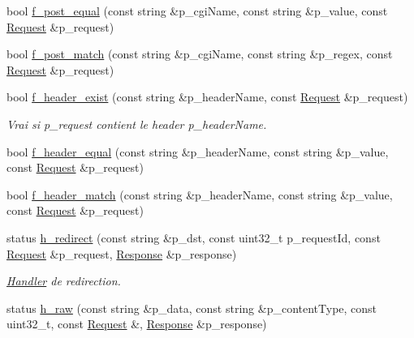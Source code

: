 \begin{DoxyCompactItemize}
bool \hyperlink{classxtd_1_1network_1_1http_1_1Server_a5ffcf38b185fc098c12969df414fe732}{f\+\_\+post\+\_\+equal} (const string \&p\+\_\+cgi\+Name, const string \&p\+\_\+value, const \hyperlink{classxtd_1_1network_1_1http_1_1Request}{Request} \&p\+\_\+request)
\item 
bool \hyperlink{classxtd_1_1network_1_1http_1_1Server_af5dbf38109b8345e6dcc7f29dfdd781a}{f\+\_\+post\+\_\+match} (const string \&p\+\_\+cgi\+Name, const string \&p\+\_\+regex, const \hyperlink{classxtd_1_1network_1_1http_1_1Request}{Request} \&p\+\_\+request)
\item 
bool \hyperlink{classxtd_1_1network_1_1http_1_1Server_a7f7478d5e4c12fed3743b42f7d118398}{f\+\_\+header\+\_\+exist} (const string \&p\+\_\+header\+Name, const \hyperlink{classxtd_1_1network_1_1http_1_1Request}{Request} \&p\+\_\+request)
\begin{DoxyCompactList}\small\item\em Vrai si p\+\_\+request contient le header p\+\_\+header\+Name. \end{DoxyCompactList}\item 
bool \hyperlink{classxtd_1_1network_1_1http_1_1Server_a68192c550d0c9aa2d3341c3b7acbbb55}{f\+\_\+header\+\_\+equal} (const string \&p\+\_\+header\+Name, const string \&p\+\_\+value, const \hyperlink{classxtd_1_1network_1_1http_1_1Request}{Request} \&p\+\_\+request)
\item 
bool \hyperlink{classxtd_1_1network_1_1http_1_1Server_a015a4e5a2f93dc0df58e4c28af2e5e31}{f\+\_\+header\+\_\+match} (const string \&p\+\_\+header\+Name, const string \&p\+\_\+value, const \hyperlink{classxtd_1_1network_1_1http_1_1Request}{Request} \&p\+\_\+request)
\item 
status \hyperlink{classxtd_1_1network_1_1http_1_1Server_a172fc1cfb74fb3ca9930b1285ba80f9d}{h\+\_\+redirect} (const string \&p\+\_\+dst, const uint32\+\_\+t p\+\_\+request\+Id, const \hyperlink{classxtd_1_1network_1_1http_1_1Request}{Request} \&p\+\_\+request, \hyperlink{classxtd_1_1network_1_1http_1_1Response}{Response} \&p\+\_\+response)
\begin{DoxyCompactList}\small\item\em \hyperlink{classxtd_1_1network_1_1http_1_1Server_1_1Handler}{Handler} de redirection. \end{DoxyCompactList}\item 
status \hyperlink{classxtd_1_1network_1_1http_1_1Server_a39fef0364300dcc2ff7391c821d5310d}{h\+\_\+raw} (const string \&p\+\_\+data, const string \&p\+\_\+content\+Type, const uint32\+\_\+t, const \hyperlink{classxtd_1_1network_1_1http_1_1Request}{Request} \&, \hyperlink{classxtd_1_1network_1_1http_1_1Response}{Response} \&p\+\_\+response)

\end{DoxyCompactItemize}
